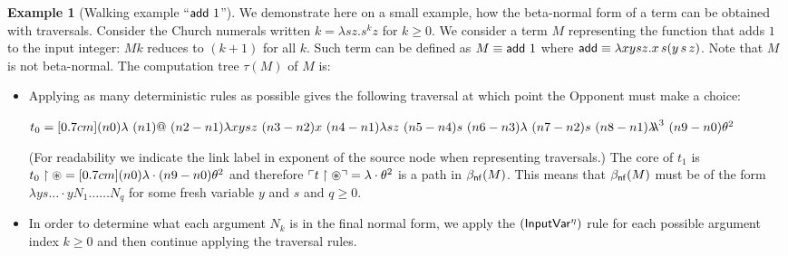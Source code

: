 \documentclass{article}
\theoremstyle{definition}
\newtheorem{example}{Example}[section]
\newcommand{\ghostlmd}{{\lambda\!\!\lambda}}
\newcommand{\ghostvar}{\theta}
\begin{document}
\begin{example}[Walking example ``${\sf add}\ 1$'']
We demonstrate here on a small example, how the beta-normal form of a term can be obtained with traversals.
Consider the Church numerals written $k = \lambda s z . s^k z$ for $k\geq0$. We consider a term $M$ representing the function that adds $1$ to the input integer: $M k$ reduces to $(k+1)$ for all $k$. Such term can be defined as $M \equiv{\sf add}\ 1$ where
${\sf add} \equiv \lambda x y s z. x\, s (y\, s\, z)$.
Note that $M$ is not beta-normal.
The computation tree $\tau(M)$ of $M$ is:

\begin{itemize}
\item Applying as many deterministic rules as possible gives the following traversal at which point the Opponent must make a choice:

$t_0 = \Pstr[0.7cm]{(n0){\lambda }\ (n1){@}\ (n2-n1){\lambda x y s z}\ (n3-n2){x}\ (n4-n1){\lambda s z}\ (n5-n4){s}\ (n6-n3){\lambda }\ (n7-n2){s}\ (n8-n1){\ghostlmd^3}\ (n9-n0){\ghostvar^2} }$

(For readability we indicate the link label in exponent of the source node when representing traversals.)
The core of $t_1$ is
$t_0\filter\theroot = \Pstr[0.7cm]{(n0){\lambda } \cdot (n9-n0){{\ghostvar^2}} }$
and therefore $\pview{t\filter\theroot} =  \lambda \cdot \ghostvar^2$ is a path in  $\beta_{\sf nf}(M)$.
This means that $\beta_{\sf nf}(M)$ must be of the form $\lambda y s \ldots \cdot y N_1 \ldots \ldots N_q$ for some fresh variable $y$ and $s$ and $q\geq0$.

\item In order to determine what each argument $N_k$ is in the final normal form, we apply the $\mathbf{({\sf InputVar^\eta})}$ rule for each possible argument index $k\geq 0$ and then continue applying the traversal rules.


\end{itemize}
\end{example}
\end{document}
